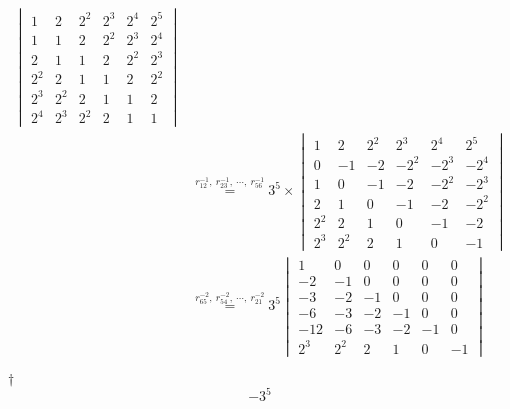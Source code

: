 \documentclass[a4paper,12pt]{article}
\begin{document}
\begin{enumerate}
\begin{equation}
\begin{aligned}
\begin{vmatrix}
                1 & 2 & 2^2 & 2^3 & 2^4 & 2^5 \\
                1 & 1 & 2 & 2^2 & 2^3 & 2^4 \\
                2 & 1 & 1 & 2 & 2^2 & 2^3 \\
                2^2 & 2 & 1 & 1 & 2 & 2^2 \\
                2^3 & 2^2 & 2 & 1 & 1 & 2 \\
                2^4 & 2^3 & 2^2 & 2 & 1 & 1
            \end{vmatrix} \\
            & \overset{r_{12}^{-1}, \ r_{23}^{-1}, \ \cdots, \ r_{56}^{-1}}= 3^5 \times \begin{vmatrix}
                1 & 2 & 2^2 & 2^3 & 2^4 & 2^5 \\
                0 & -1 & -2 & -2^2 & -2^3 & -2^4 \\
                1 & 0 & -1 & -2 & -2^2 & -2^3 \\
                2 & 1 & 0 & -1 & -2 & -2^2 \\
                2^2 & 2 & 1 & 0 & -1 & -2 \\
                2^3 & 2^2 & 2 & 1 & 0 & -1 
            \end{vmatrix} \\
            & \overset{r_{65}^{-2}, \ r_{54}^{-2}, \ \cdots, \ r_{21}^{-2}}= 3^5 \begin{vmatrix}
                1 & 0 & 0 & 0 & 0 & 0 \\
                -2 & -1 & 0 & 0 & 0 & 0 \\
                -3 & -2 & -1 & 0 & 0 & 0 \\
                -6 & -3 & -2 & -1 & 0 & 0 \\
                -12 & -6 & -3 & -2 & -1 & 0 \\
                2^3 & 2^2 & 2 & 1 & 0 & -1 
            \end{vmatrix}
        \end{aligned}
    \end{equation}
    \begin{answer}{$\dag$}\begin{equation}
            -3^5
        \end{equation}
    \end{answer}

\end{enumerate}
\end{document}
